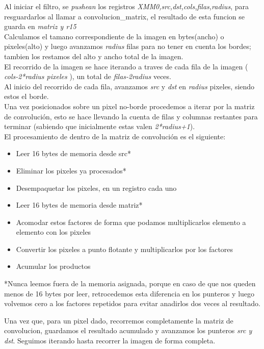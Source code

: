 Al iniciar el filtro, se \emph{pushean} los registros \emph{XMM0,src,dst,cols,filas,radius}, para resguardarlos al llamar a convolucion\_matrix, el resultado de esta funcion se guarda en \emph{matriz y r15} \\
Calculamos el tama\-no correspondiente de la imagen en bytes(ancho) o pixeles(alto) y luego avanzamos \emph{radius} filas para no tener en cuenta los bordes; tambien los restamos del alto y ancho total de la imagen. \\
El recorrido de la imagen se hace iterando a traves de cada fila de la imagen ( \emph{cols-2*radius pixeles} ), un total de \emph{filas-2radius} veces. \\
Al inicio del recorrido de cada fila, avanzamos \emph{src} y \emph{dst} en \emph{radius} pixeles, siendo estos el borde.  \\
Una vez posicionados sobre un pixel no-borde procedemos a iterar por la matriz de convoluci\'on, esto se hace llevando la cuenta de filas y columnas restantes para terminar (sabiendo que inicialmente estas valen \emph{2*radius+1}). \\
El procesamiento de dentro de la matriz de convoluci\'on es el siguiente:
\begin{itemize}
\item Leer 16 bytes de memoria desde src*
\item Eliminar los pixeles ya procesados*
\item Desempaquetar los pixeles, en un registro cada uno
\item Leer 16 bytes de memoria desde matriz*
\item Acomodar estos factores de forma que podamos multiplicarlos elemento a elemento con los pixeles
\item Convertir los pixeles a punto flotante y multiplicarlos por los factores
\item Acumular los productos
\end{itemize}

*Nunca leemos fuera de la memoria asignada, porque en caso de que nos queden menos de 16 bytes por leer, retrocedemos esta diferencia en los punteros y luego volvemos cero a los factores repetidos para evitar a\-nadirlos dos veces al resultado. \\

Una vez que, para un pixel dado, recorremos completamente la matriz de convolucion, guardamos el resultado acumulado y avanzamos los punteros \emph{src y dst}. Seguimos iterando hasta recorrer la imagen de forma completa.